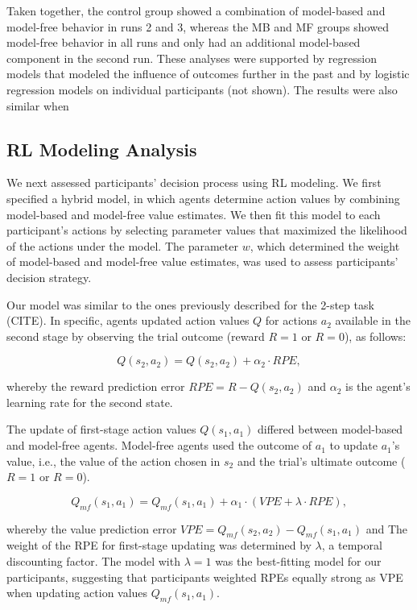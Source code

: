 \documentclass[11pt]{article} %
\begin{document}
Taken together, the control group showed a combination of model-based and model-free behavior in runs 2 and 3, whereas the MB and MF groups showed model-free behavior in all runs and only had an additional model-based component in the second run. These analyses were supported by regression models that modeled the influence of outcomes further in the past and by logistic regression models on individual participants (not shown). The results were also similar when 

\subsection{RL Modeling Analysis}
We next assessed participants' decision process using RL modeling. We first specified a hybrid model, in which agents determine action values by combining model-based and model-free value estimates. We then fit this model to each participant's actions by selecting parameter values that maximized the likelihood of the actions under the model. The parameter $w$, which determined the weight of model-based and model-free value estimates, was used to assess participants' decision strategy.

Our model was similar to the ones previously described for the 2-step task (CITE). In specific, agents updated action values $Q$ for actions $a_{2}$ available in the second stage by observing the trial outcome (reward $R = 1$ or $R = 0$), as follows:

\begin{equation}
Q(s_{2}, a_{2}) = Q(s_{2}, a_{2}) + \alpha_{2} \cdot RPE,
\end{equation}

whereby the reward prediction error $RPE = R - Q(s_{2}, a_{2})$ and $\alpha_{2}$ is the agent's learning rate for the second state.

The update of first-stage action values $Q(s_{1}, a_{1})$ differed between model-based and model-free agents. Model-free agents used the outcome of $a_{1}$ to update $a_{1}$'s value, i.e., the value of the action chosen in $s_{2}$ and the trial's ultimate outcome ($R = 1$ or $R = 0$).

\begin{equation}
Q_{mf}(s_{1}, a_{1}) = Q_{mf}(s_{1}, a_{1}) + \alpha_{1} \cdot (VPE + \lambda \cdot RPE),
\end{equation}

whereby the value prediction error $VPE = Q_{mf}(s_{2}, a_{2}) - Q_{mf}(s_{1}, a_{1})$ and The weight of the RPE for first-stage updating was determined by $ \lambda $, a temporal discounting factor. The model with $\lambda = 1$ was the best-fitting model for our participants, suggesting that participants weighted RPEs equally strong as VPE when updating action values $Q_{mf}(s_{1}, a_{1})$.
\end{document}
